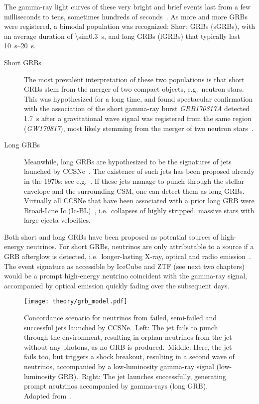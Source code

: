 The gamma-ray light curves of these very bright and brief events last from a few milliseconds to tens, sometimes hundreds of seconds~. As more and more GRBs were registered, a bimodal population was recognized: Short GRBs (sGRBs), with an average duration of \SI{\sim0.3}{\s}, and long GRBs (lGRBs) that typically last \SIrange{10}{20}{\s}.

\begin{description}
  \item[Short GRBs] The most prevalent interpretation of these two populations is that short GRBs stem from the merger of two compact objects, e.g.~neutron stars. This was hypothesized for a long time, and found spectacular confirmation with the association of the short gamma-ray burst \textit{GRB170817A} detected \SI{1.7}{\s} after a gravitational wave signal was registered from the same region (\textit{GW170817}), most likely stemming from the merger of two neutron stars~.

  \item[Long GRBs] Meanwhile, long GRBs are hypothesized to be the signatures of jets launched by CCSNe~. The existence of such jets has been proposed already in the 1970s; see e.g.~. If these jets manage to punch through the stellar envelope and the surrounding CSM, one can detect them as long GRBs. Virtually all CCSNe that have been associated with a prior long GRB were Broad-Line Ic (Ic-BL)~, i.e.\ collapses of highly stripped, massive stars with large ejecta velocities.
\end{description}

Both short and long GRBs have been proposed as potential sources of high-energy neutrinos. For short GRBs, neutrinos are only attributable to a source if a GRB afterglow is detected, i.e.\ longer-lasting X-ray, optical and radio emission~. The event signature as accessible by IceCube and ZTF (see next two chapters) would be a prompt high-energy neutrino coincident with the gamma-ray signal, accompanied by optical emission quickly fading over the subsequent days.

\begin{figure*}[htb]
  \texttt{[image: theory/grb\_model.pdf]}
  \caption[High-energy neutrinos from GRBs]{Concordance scenario for neutrinos from failed, semi-failed and successful jets launched by CCSNe.\ Left: The jet fails to punch through the environment, resulting in orphan neutrinos from the jet without any photons, as no GRB is produced.\ Middle: Here, the jet fails too, but triggers a shock breakout, resulting in a second wave of neutrinos, accompanied by a low-luminosity gamma-ray signal (low-luminosity GRB).\ Right: The jet launches successfully, generating prompt neutrinos accompanied by gamma-rays (long GRB). Adapted from~\cite{Senno2016}.}
\end{figure*}

